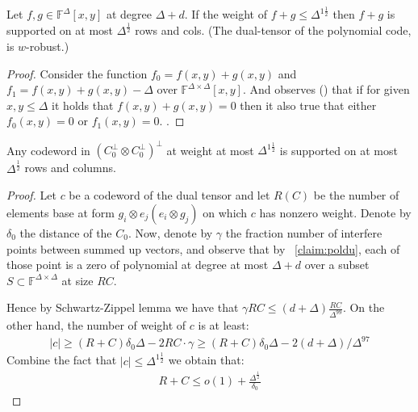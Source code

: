 \begin{claim}
  Let $f,g \in \mathbb{F}^{\Delta}[x,y]$ at degree $\Delta + d$. If the weight of $f+g \le \Delta^{1 \frac{1}{2}}$ then $f+g$ is supported on at most $\Delta^{\frac{1}{2}}$ rows and cols. 
  (The dual-tensor of the polynomial code, is $w$-robust.)
\end{claim}
\begin{proof}
 
  Consider the function $f_{0} = f(x,y) + g(x,y)$ and $f_{1} = f(x,y) + g(x,y) -\Delta$ over $\mathbb{F}^{\Delta\times\Delta}[x,y]$. And observes () that if for given $x,y \le \Delta$ it holds that $f(x,y) + g(x,y) = 0$ then it also true that either $f_{0}(x,y) = 0 $ or $f_{1}(x,y) = 0$. .   
\end{proof}

\begin{claim}
  \label{claim:lim}
  Any codeword in $\left( C_{0}^{\perp} \otimes C_{0}^{\perp} \right)^{\perp}$ at weight at most $\Delta^{1 \frac{1}{2}}$ is supported on at most $\Delta^{\frac{1}{2}} $ rows and columns.
\end{claim}
\begin{proof}
  Let $c$ be a codeword of the dual tensor and let $R (C)$ be the number of elements base at form $g_{i}\otimes e_{j} (e_{i} \otimes g_{j})$ on which $c$ has nonzero weight. Denote by $\delta_{0}$ the distance of the $C_{0}$. Now, denote by $\gamma$ the fraction number of interfere points between summed up vectors, and observe that by ~\cref{claim:poldu}, each of those point is a zero of polynomial at degree at most $\Delta + d$ over a subset $S \subset \mathbb{F}^{\Delta\times \Delta} $ at size $RC$.     

  Hence by Schwartz-Zippel lemma \cite{Schwartz} we have that $\gamma RC \le \left( d + \Delta \right) \frac{RC}{\Delta^{99}} $. On the other hand, the number of weight of $c$ is at least: 
\begin{equation*}
    \begin{split}
      |c| \ge \left( R + C  \right) \delta_{0}\Delta - 2 RC \cdot \gamma  \ge \left( R + C \right)\delta_{0}\Delta -2 \left( d + \Delta  \right) / \Delta^{97}
    \end{split}
  \end{equation*}
  Combine the fact that $|c| \le \Delta^{1 \frac{1}{2}}$ we obtain that: 
  \begin{equation*}
    \begin{split}
      R + C \le o(1) + \frac{\Delta^{\frac{1}{2}}}{\delta_{0}}
    \end{split}
  \end{equation*}
\end{proof}
  
